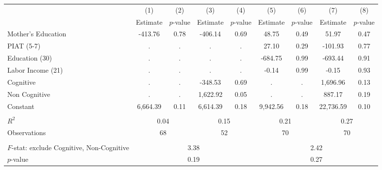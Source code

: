\begin{tabular}{lcccccccc} \toprule
 & (1) & (2) & (3) & (4) & (5) & (6) & (7) & (8) \\
 & Estimate & $p$-value & Estimate & $p$-value  & Estimate & $p$-value  & Estimate & $p$-value  \\ \midrule 
Mother's Education &      -413.76 &         0.78 &      -406.14 &         0.69 &        48.75 &         0.49 &        51.97 &         0.47 \\  
PIAT (5-7) &            . &            . &            . &            . &        27.10 &         0.29 &      -101.93 &         0.77 \\  
Education (30) &            . &            . &            . &            . &      -684.75 &         0.99 &      -693.44 &         0.91 \\  
Labor Income (21) &            . &            . &            . &            . &        -0.14 &         0.99 &        -0.15 &         0.93 \\  
Cognitive &            . &            . &      -348.53 &         0.69 &            . &            . &     1,696.96 &         0.13 \\  
Non Cognitive &            . &            . &     1,622.92 &         0.05 &            . &            . &       887.17 &         0.19 \\  
Constant &     6,664.39 &         0.11 &     6,614.39 &         0.18 &     9,942.56 &         0.18 &    22,736.59 &         0.10 \\  \\ \midrule 
$R^2$ &          \multicolumn{2}{c}{0.04} &             \multicolumn{2}{c}{0.15} &            \multicolumn{2}{c}{0.21} &              \multicolumn{2}{c}{0.27}   \\  
Observations &         \multicolumn{2}{c}{68} &                 \multicolumn{2}{c}{52} &               \multicolumn{2}{c}{70}  &                \multicolumn{2}{c}{70}   \\  \\ \midrule
$F$-stat: exclude Cognitive, Non-Cognitive  &                 \multicolumn{4}{c}{3.38} &              \multicolumn{4}{c}{2.42}  \\  
$p$-value &                \multicolumn{4}{c}{0.19} &               \multicolumn{4}{c}{0.27}  \\      \bottomrule \end{tabular}